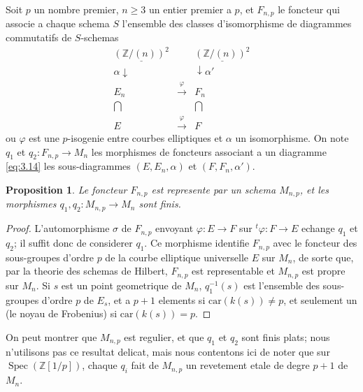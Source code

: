 \documentclass[11pt,reqno]{amsart}
\theoremstyle{plain}
\newtheorem{proposition}[theorem]{Proposition}
\theoremstyle{remark}
\DeclareMathOperator{\Spec}{Spec}
\newcommand{\Z}{\mathbb{Z}}
\numberwithin{equation}{section}
\begin{document}
Soit $p$ un nombre premier, $n \geq 3$ un entier premier a $p$, et $F_{n,p}$ le foncteur qui associe a chaque schema $S$ l'ensemble des classes d'isomorphisme de diagrammes commutatifs de $S$-schemas
\begin{equation}\label{eq:3.14}
\begin{array}{ccc}
\underline{(\Z/(n))^2} & & \underline{(\Z/(n))^2} \\
\alpha \downarrow & & \downarrow \alpha' \\
E_n & \xrightarrow{\;\varphi\;} & F_n \\
\bigcap & & \bigcap \\
E & \xrightarrow{\;\varphi\;} & F
\end{array}
\end{equation}
ou $\varphi$ est une $p$-isogenie entre courbes elliptiques et $\alpha$ un isomorphisme. On note $q_1$ et $q_2: F_{n,p} \to M_n$ les morphismes de foncteurs associant a un diagramme \eqref{eq:3.14} les sous-diagrammes $(E, E_n, \alpha)$ et $(F, F_n, \alpha')$.

\begin{proposition}\label{prop:3.15}
Le foncteur $F_{n,p}$ est represente par un schema $M_{n,p}$, et les morphismes $q_1, q_2: M_{n,p} \to M_n$ sont finis.
\end{proposition}

\begin{proof}
L'automorphisme $\sigma$ de $F_{n,p}$ envoyant $\varphi: E \to F$ sur $^t\!\varphi: F \to E$ echange $q_1$ et $q_2$; il suffit donc de considerer $q_1$. Ce morphisme identifie $F_{n,p}$ avec le foncteur des sous-groupes d'ordre $p$ de la courbe elliptique universelle $E$ sur $M_n$, de sorte que, par la theorie des schemas de Hilbert, $F_{n,p}$ est representable et $M_{n,p}$ est propre sur $M_n$. Si $s$ est un point geometrique de $M_n$, $q_1^{-1}(s)$ est l'ensemble des sous-groupes d'ordre $p$ de $E_s$, et a $p+1$ elements si $\text{car}(k(s)) \neq p$, et seulement un (le noyau de Frobenius) si $\text{car}(k(s)) = p$.
\end{proof}

On peut montrer que $M_{n,p}$ est regulier, et que $q_1$ et $q_2$ sont finis plats; nous n'utilisons pas ce resultat delicat, mais nous contentons ici de noter que sur $\Spec(\Z[1/p])$, chaque $q_i$ fait de $M_{n,p}$ un revetement etale de degre $p+1$ de $M_n$.
\end{document}
